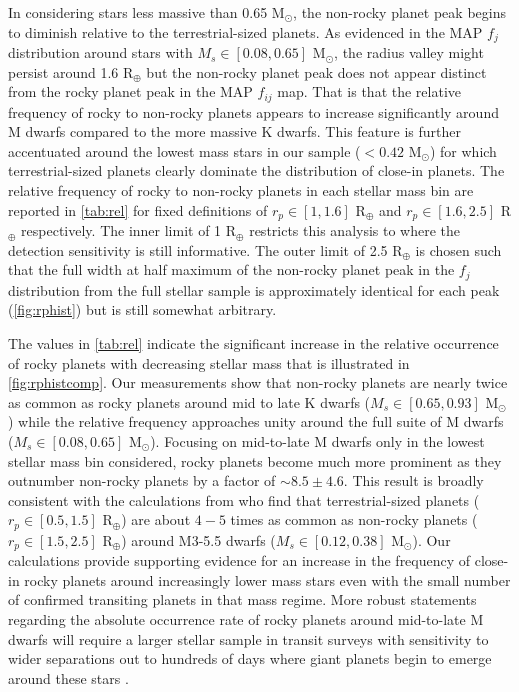 \documentclass[twocolumn]{emulateapj}
\begin{document}
In considering stars less massive than 0.65 M$_{\odot}$, the non-rocky planet peak begins to diminish relative
to the terrestrial-sized planets. As evidenced in the MAP $f_j$ distribution around stars with
$M_s \in [0.08,0.65]$ M$_{\odot}$, the radius valley might persist around 1.6 R$_{\oplus}$ but the non-rocky planet
peak does not appear distinct from the rocky planet peak in the MAP $f_{ij}$ map. That is that the relative
frequency of rocky to non-rocky planets appears to increase significantly around M dwarfs compared to the more
massive K dwarfs. This feature is further accentuated around the lowest mass stars in our sample ($<0.42$
M$_{\odot}$) for which terrestrial-sized planets clearly dominate the distribution of close-in planets. The relative
frequency of rocky to non-rocky planets in each stellar mass bin are reported in \autoref{tab:rel}
for fixed definitions of $r_p \in [1,1.6]$ R$_{\oplus}$ and $r_p \in [1.6,2.5]$ R$_{\oplus}$ respectively. The inner
limit of 1 R$_{\oplus}$ restricts this analysis to where the detection sensitivity is still informative. The outer
limit of 2.5 R$_{\oplus}$ is chosen such that the full width at half maximum of the non-rocky planet peak in the
$f_j$ distribution from the full stellar sample is approximately identical for each peak (\autoref{fig:rphist})
but is still somewhat arbitrary.



The values in \autoref{tab:rel} indicate the significant increase in the relative occurrence of rocky
planets with decreasing stellar mass that is illustrated in \autoref{fig:rphistcomp}. Our measurements show
that non-rocky planets are nearly twice as common as rocky planets
around mid to late K dwarfs ($M_s \in [0.65,0.93]$ M$_{\odot}$) while the relative frequency approaches unity
around the full suite of M dwarfs ($M_s \in [0.08,0.65]$ M$_{\odot}$). Focusing on mid-to-late M dwarfs only in
the lowest stellar mass bin considered, rocky planets become much more prominent as they outnumber non-rocky
planets by a factor of $\sim 8.5\pm 4.6$. This result is broadly
consistent with the calculations from \cite{hardegree19} who find that terrestrial-sized 
planets ($r_p \in[0.5,1.5]$ R$_{\oplus}$) are about $4-5$ times as common as non-rocky planets ($r_p \in [1.5,2.5]$
R$_{\oplus}$) around M3-5.5 dwarfs ($M_s \in [0.12,0.38]$ M$_{\odot}$). 
Our calculations provide supporting evidence for an increase in the frequency of close-in rocky planets
around increasingly lower mass stars even with the small number of confirmed transiting planets in that mass
regime. More robust statements regarding the absolute occurrence rate of rocky planets around mid-to-late
M dwarfs will require a larger stellar sample in transit surveys with sensitivity to wider separations out to
hundreds of days where giant planets begin to emerge around these stars \citep{bonfils13,morales19}.
\end{document}
